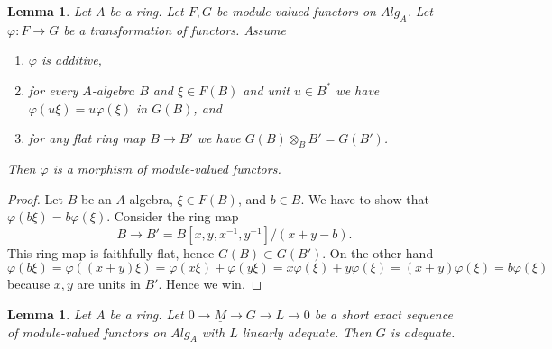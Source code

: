 \documentclass{stacks-project}
\theoremstyle{plain}
\newtheorem{lemma}[subsection]{Lemma}
\theoremstyle{definition}
\theoremstyle{remark}
\numberwithin{equation}{subsection}
\begin{document}
\begin{lemma}
\label{lemma-flat-linear-functor}
Let $A$ be a ring.
Let $F, G$ be module-valued functors on $\textit{Alg}_A$.
Let $\varphi : F \to G$ be a transformation of functors. Assume
\begin{enumerate}
\item $\varphi$ is additive,
\item for every $A$-algebra $B$ and $\xi \in F(B)$ and unit
$u \in B^*$ we have $\varphi(u\xi) = u\varphi(\xi)$ in $G(B)$, and
\item for any flat ring map $B \to B'$ we have
$G(B) \otimes_B B' = G(B')$.
\end{enumerate}
Then $\varphi$ is a morphism of module-valued functors.
\end{lemma}

\begin{proof}
Let $B$ be an $A$-algebra, $\xi \in F(B)$, and $b \in B$. We have to show
that $\varphi(b \xi) = b \varphi(\xi)$. Consider the ring map
$$
B \to B' = B[x, y, x^{-1}, y^{-1}]/(x + y - b).
$$
This ring map is faithfully flat, hence $G(B) \subset G(B')$. On the
other hand
$$
\varphi(b\xi) = \varphi((x + y)\xi) =
\varphi(x\xi) + \varphi(y\xi) = x\varphi(\xi) + y\varphi(\xi)
= (x + y)\varphi(\xi) = b\varphi(\xi)
$$
because $x, y$ are units in $B'$. Hence we win.
\end{proof}

\begin{lemma}
\label{lemma-extension-adequate-key}
Let $A$ be a ring.
Let $0 \to \underline{M} \to G \to L \to 0$ be a short exact sequence
of module-valued functors on $\textit{Alg}_A$ with $L$ linearly adequate.
Then $G$ is adequate.
\end{lemma}
\end{document}
